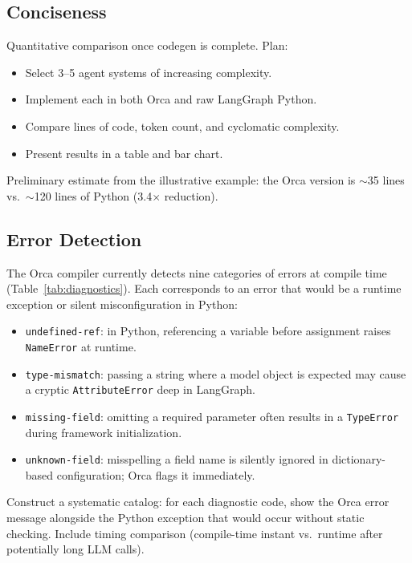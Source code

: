 \documentclass[sigconf,nonacm]{acmart}
\begin{document}
\subsection{Conciseness}
\label{sec:eval:conciseness}

\begin{todobox}
Quantitative comparison once codegen is complete. Plan:
\begin{itemize}
  \item Select 3--5 agent systems of increasing complexity.
  \item Implement each in both Orca and raw LangGraph Python.
  \item Compare lines of code, token count, and cyclomatic complexity.
  \item Present results in a table and bar chart.
\end{itemize}
Preliminary estimate from the illustrative example: the Orca version is
$\sim$35 lines vs.\ $\sim$120 lines of Python (3.4$\times$ reduction).
\end{todobox}

\subsection{Error Detection}
\label{sec:eval:errors}

The Orca compiler currently detects nine categories of errors at compile
time (Table~\ref{tab:diagnostics}). Each corresponds to an error that
would be a runtime exception or silent misconfiguration in Python:

\begin{itemize}[leftmargin=*]
  \item \texttt{undefined-ref}: in Python, referencing a variable before
        assignment raises \texttt{NameError} at runtime.
  \item \texttt{type-mismatch}: passing a string where a model object is
        expected may cause a cryptic \texttt{AttributeError} deep in
        LangGraph.
  \item \texttt{missing-field}: omitting a required parameter often results
        in a \texttt{TypeError} during framework initialization.
  \item \texttt{unknown-field}: misspelling a field name is silently ignored
        in dictionary-based configuration; Orca flags it immediately.
\end{itemize}

\begin{todobox}
Construct a systematic catalog: for each diagnostic code, show the Orca
error message alongside the Python exception that would occur without
static checking. Include timing comparison (compile-time instant vs.\
runtime after potentially long LLM calls).
\end{todobox}
\end{document}
